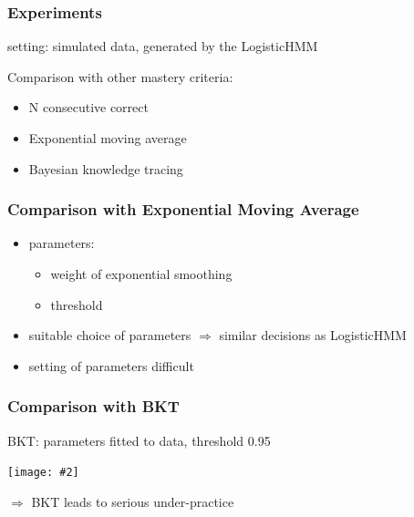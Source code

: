 \documentclass[bigger]{beamer}
\newcommand{\img}[2]{
  \begin{center}
    \texttt{[image: \#2]}
  \end{center}
}
\begin{document}
\begin{frame}
  \frametitle{Experiments}

  setting: simulated data, generated by the LogisticHMM

  \bigskip

  Comparison with other mastery criteria:
  \begin{itemize}
  \item N consecutive correct
  \item Exponential moving average
  \item Bayesian knowledge tracing
  \end{itemize}
\end{frame}

\begin{frame}
  \frametitle{Comparison with Exponential Moving Average}

  \begin{itemize}
  \item parameters: 
    \begin{itemize}
    \item weight of exponential smoothing
    \item threshold
    \end{itemize}
  \item suitable choice of parameters $\Rightarrow$ similar decisions as
    LogisticHMM
  \item setting of parameters difficult
  \end{itemize}

\end{frame}

\begin{frame}
  \frametitle{Comparison with BKT}

  BKT: parameters fitted to data, threshold 0.95

  \img{.7}{hmm_bkt}

  $\Rightarrow$ BKT leads to serious under-practice
\end{frame}
\end{document}
